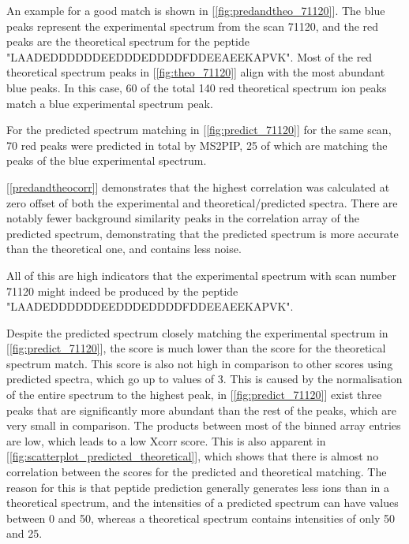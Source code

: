 \documentclass[11pt]{article}
\begin{document}
An example for a good match is shown in [\cref{fig:predandtheo_71120}]. %
The blue peaks represent the experimental spectrum from the scan 71120, and the red peaks are the theoretical spectrum for the peptide "LAADEDDDDDDEEDDDEDDDDFDDEEAEEKAPVK". Most of the red theoretical spectrum peaks in [\cref{fig:theo_71120}] align with the most abundant blue peaks. In this case, 60 of the total 140 red theoretical spectrum ion peaks match a blue experimental spectrum peak. 

For the predicted spectrum matching in [\cref{fig:predict_71120}] for the same scan, 70 red peaks were predicted in total by MS2PIP, 25 of which are matching the peaks of the blue experimental spectrum.

[\cref{predandtheocorr}] demonstrates that the highest correlation was calculated at zero offset of both the experimental and theoretical/predicted spectra. There are notably fewer background similarity peaks in the correlation array of the predicted spectrum, demonstrating that the predicted spectrum is more accurate than the theoretical one, and contains less noise.

All of this are high indicators that the experimental spectrum with scan number 71120 might indeed be produced by the peptide "LAADEDDDDDDEEDDDEDDDDFDDEEAEEKAPVK".

Despite the predicted spectrum closely matching the experimental spectrum in [\cref{fig:predict_71120}], the score is much lower than the score for the theoretical spectrum match. This score is also not high in comparison to other scores using predicted spectra, which go up to values of 3. This is caused by the normalisation of the entire spectrum to the highest peak, in [\cref{fig:predict_71120}] exist three peaks that are significantly more abundant than the rest of the peaks, which are very small in comparison. The products between most of the binned array entries are low, which leads to a low Xcorr score. This is also apparent in [\cref{fig:scatterplot_predicted_theoretical}], which shows that there is almost no correlation between the scores for the predicted and theoretical matching. The reason for this is that peptide prediction generally generates less ions than in a theoretical spectrum, and the intensities of a predicted spectrum can have values between 0 and 50, whereas a theoretical spectrum contains intensities of only 50 and 25.
\end{document}
